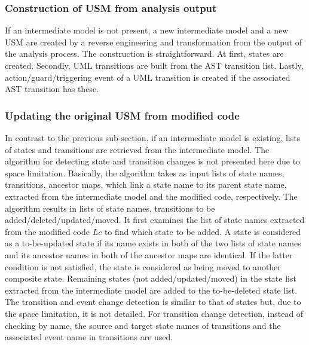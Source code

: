 \subsubsection{Construction of USM from analysis output}
If an intermediate model is not present, a new intermediate model and a new USM are created by a reverse engineering and transformation from the output of the analysis process. The construction is straightforward. At first, states are created. Secondly, UML transitions are built from the AST transition list. Lastly, action/guard/triggering event of a UML transition is created if the associated AST transition has these.

\subsubsection{Updating the original USM from modified code}
In contrast to the previous sub-section, if an intermediate model is existing, lists of states and transitions are retrieved from the intermediate model. 
The algorithm for detecting state and transition changes is not presented here due to space limitation. Basically, the algorithm takes as input lists of state names, transitions, ancestor maps, which link a state name to its parent state name, extracted from the intermediate model and the modified code, respectively. The algorithm results in lists of state names, transitions to be added/deleted/updated/moved. It first examines the list of state names extracted from the modified code $Lc$ to find which state to be added. A state is considered as a to-be-updated state if its name exists in both of the two lists of state names and its ancestor names in both of the ancestor maps are identical. If the latter condition is not satisfied, the state is considered as being moved to another composite state. Remaining states (not added/updated/moved) in the state list extracted from the intermediate model are added to the to-be-deleted state list. The transition and event change detection is similar to that of states but, due to the space limitation, it is not detailed. For transition change detection, instead of checking by name, the source and target state names of transitions and the associated event name in transitions are used.

